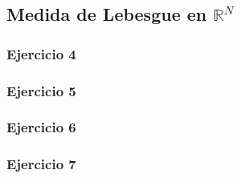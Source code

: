 \documentclass[11pt,spanish]{article} %
\begin{document}
\subsection{Medida de Lebesgue en $\mathbb{R}^N$}
	\subsubsection{Ejercicio 4}
	
	\subsubsection{Ejercicio 5}
	
	\subsubsection{Ejercicio 6}
	
	\subsubsection{Ejercicio 7}
	
	
\end{document}
